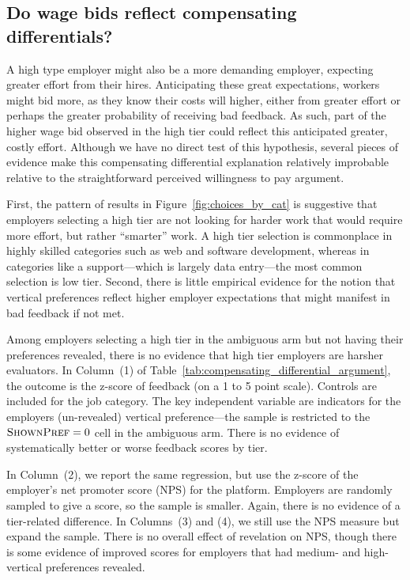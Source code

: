 \documentclass[12pt]{article}
\begin{document}
\subsection{Do wage bids reflect compensating differentials?} \label{sec:compensating_differentials}
A high type employer might also be a more demanding employer, expecting greater effort from their hires.
Anticipating these great expectations, workers might bid more, as they know their costs will higher, either from greater effort or perhaps the greater probability of receiving bad feedback.
As such, part of the higher wage bid observed in the high tier could reflect this anticipated greater, costly effort.
Although we have no direct test of this hypothesis, several pieces of evidence make this compensating differential explanation relatively improbable relative to the straightforward perceived willingness to pay argument.

First, the pattern of results in Figure~\ref{fig:choices_by_cat} is suggestive that employers selecting a high tier are not looking for harder work that would require more effort, but rather ``smarter'' work.
A high tier selection is commonplace in highly skilled categories such as web and software development, whereas in categories like a support---which is largely data entry---the most common selection is low tier.
Second, there is little empirical evidence for the notion that vertical preferences reflect higher employer expectations that might manifest in bad feedback if not met. 

Among employers selecting a high tier in the ambiguous arm but not having their preferences revealed, there is no evidence that high tier employers are harsher evaluators.
In Column~(1) of Table~\ref{tab:compensating_differential_argument}, the outcome is the z-score of feedback (on a 1 to 5 point scale).
Controls are included for the job category.
The key independent variable are indicators for the employers (un-revealed) vertical preference---the sample is restricted to the $\textsc{ShownPref} = 0$ cell in the ambiguous arm.
There is no evidence of systematically better or worse feedback scores by tier.

In Column~(2), we report the same regression, but use the z-score of the employer's net promoter score (NPS) for the platform.
Employers are randomly sampled to give a score, so the sample is smaller.
Again, there is no evidence of a tier-related difference.
In Columns~(3) and (4), we still use the NPS measure but expand the sample.
There is no overall effect of revelation on NPS, though there is some evidence of improved scores for employers that had medium- and high-vertical preferences revealed. 
\end{document}
